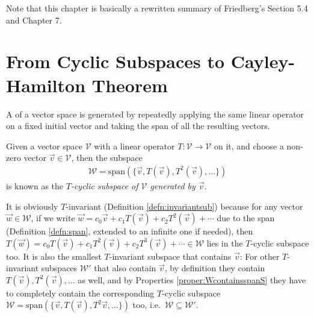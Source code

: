 Note that this chapter is basically a rewritten summary of Friedberg's Section 5.4 and Chapter 7. 

\section{From Cyclic Subspaces to Cayley-Hamilton Theorem}
\label{section:B1}

A  of a vector space is generated by repeatedly applying the same linear operator on a fixed initial vector and taking the span of all the resulting vectors.
\begin{defn}
Given a vector space $\mathcal{V}$ with a linear operator $T: \mathcal{V} \to \mathcal{V}$ on it, and choose a non-zero vector $\vec{v} \in \mathcal{V}$, then the subspace
\begin{align}
\mathcal{W} = \text{span}(\{\vec{v}, T(\vec{v}), T^2(\vec{v}), \ldots\})
\end{align}
is known as the \textit{$T$-cyclic subspace of $\mathcal{V}$ generated by $\vec{v}$}. 
\end{defn}
It is obviously $T$-invariant (Definition \ref{defn:invariantsub}) because for any vector $\vec{w} \in \mathcal{W}$, if we write $\vec{w} = c_0\vec{v} + c_1T(\vec{v}) + c_2T^2(\vec{v}) + \cdots$ due to the span (Definition \ref{defn:span}, extended to an infinite one if needed), then $T(\vec{w}) = c_0T(\vec{v}) + c_1T^2(\vec{v}) + c_2T^3(\vec{v}) + \cdots \in \mathcal{W}$ lies in the $T$-cyclic subspace too. It is also the smallest $T$-invariant subspace that contains $\vec{v}$: For other $T$-invariant subspaces $\mathcal{W}'$ that also contain $\vec{v}$, by definition they contain $T(\vec{v}), T^2(\vec{v}), \ldots$ as well, and by Properties \ref{proper:WcontainsspanS} they have to completely contain the corresponding $T$-cyclic subspace $\mathcal{W} = \text{span}(\{\vec{v}, T(\vec{v}), T^2\vec{v}, \ldots\})$ too, i.e.\ $\mathcal{W} \subseteq \mathcal{W}'$.\par

